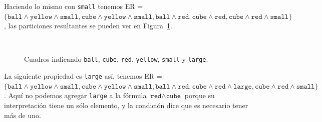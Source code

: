 Haciendo lo mismo con \texttt{small} tenemos ER = $\{\texttt{ball} \wedge \texttt{yellow} \wedge \texttt{small}, \texttt{cube} \wedge \texttt{yellow} \wedge \texttt{small}, \texttt{ball} \wedge \texttt{red}, \texttt{cube} \wedge \texttt{red}, \texttt{cube} \wedge \texttt{red} \wedge \texttt{small}\}$, las particiones resultantes se pueden ver en Figura~\ref{fig-modelo11}.

%

\begin{figure}[ht]
\begin{center}
\\[0pt]
\caption{Cuadros indicando \texttt{ball}, \texttt{cube}, \texttt{red}, \texttt{yellow}, \texttt{small} y \texttt{large}.}
\label{fig-modelo11}
\end{center}
\end{figure}

La siguiente propiedad es \texttt{large} as\'i, tenemos ER = $\{\texttt{ball} \wedge \texttt{yellow} \wedge \texttt{small}, \texttt{cube} \wedge \texttt{yellow} \wedge \texttt{small}, \texttt{ball} \wedge \texttt{red}, \texttt{cube} \wedge \texttt{red} \wedge \texttt{large}, \texttt{cube} \wedge \texttt{red} \wedge \texttt{small}\}$. Aqu\'i no podemos agregar \texttt{large} a la f\'ormula $\texttt{red} \wedge \texttt{cube}$ porque su interpretaci\'on tiene un s\'olo elemento, y la condici\'on dice que es necesario tener m\'as de uno.

